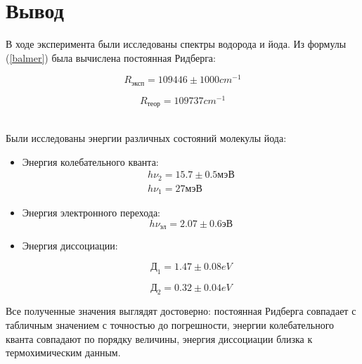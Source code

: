 \documentclass[12pt,a4paper]{article}
\begin{document}
\section{Вывод}
В ходе эксперимента были исследованы спектры водорода и йода. Из формулы (\ref{balmer}) была вычислена постоянная Ридберга: \\


\begin{minipage}{0.49\textwidth}
\begin{equation*}
R_\text{эксп} = 109446  \pm 1000 cm^{-1}
\end{equation*}
\end{minipage}
\begin{minipage}{0.49\textwidth}
\begin{equation*}
R_\text{теор} = 109737 cm^{-1}
\end{equation*}
\end{minipage}
\\
Были исследованы энергии различных состояний молекулы йода:

\begin{itemize}
\item Энергия колебательного кванта:
\begin{gather*}
h \nu_2 = 15.7 \pm 0.5 \text{мэВ} \\
h \nu_1 = 27 \text{мэВ}
\end{gather*}
\item Энергия электронного перехода:
\begin{equation*}
h \nu_\text{эл} = 2.07 \pm 0.6 \text{эВ}
\end{equation*}
\item Энергия диссоциации:

\begin{minipage}{0.49\textwidth}
\begin{equation*}
\text{Д}_1 = 1.47 \pm 0.08 eV
\end{equation*}
\end{minipage}
\begin{minipage}{0.49\textwidth}
\begin{equation*}
\text{Д}_2 = 0.32 \pm 0.04 eV 
\end{equation*}
\end{minipage}
\end{itemize}

Все полученные значения выглядят достоверно: постоянная Ридберга совпадает с табличным значением с точностью до погрешности, энергии колебательного кванта совпадают по порядку величины, энергия диссоциации близка к термохимическим данным.
\end{document}
